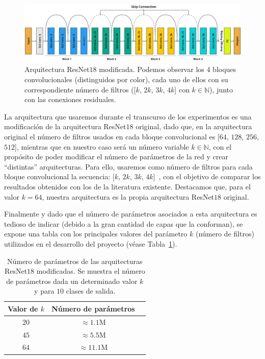 \begin{figure}[h]
    \centering
    \includegraphics[width=\linewidth]{img/experiments/resnet18modified.png}
    \caption[Arquitectura ResNet$18$ modificada.]{Arquitectura ResNet$18$ modificada. Podemos observar los 4 bloques convolucionales (distinguidos por color), cada uno de ellos con su correspondiente número de filtros ([$k$, $2k$, $3k$, $4k$] con $k \in \mathbb{N}$), junto con las conexiones residuales.}\label{fig:resnet18}
\end{figure}

La arquitectura que usaremos durante el transcurso de los experimentos es una modificación de la arquitectura ResNet$18$ original, dado que, en la arquitectura original el número de filtros usados en cada bloque convolucional es [$64$, $128$, $256$, $512$], mientras que en nuestro caso será un número variable $k \in \mathbb{N}$, con el propósito de poder modificar el número de parámetros de la red y crear ``distintas'' arquitecturas. Para ello, usaremos como número de filtros para cada bloque convolucional la secuencia: [$k$, $2k$, $3k$, $4k$]~\cite{Nakkiran2019}, con el objetivo de comparar los resultados obtenidos con los de la literatura existente. Destacamos que, para el valor $k=64$, nuestra arquitectura es la propia arquitectura ResNet$18$ original.\newline

Finalmente y dado que el número de parámetros asociados a esta arquitectura es tedioso de indicar (debido a la gran cantidad de capas que la conforman), se expone una tabla con los principales valores del parámetro $k$ (número de filtros) utilizados en el desarrollo del proyecto (véase Tabla~\ref{tab:numero-parametrosresnet}).\newline

\begin{table}[ht]
    \centering
    \begin{tabular}{|c|c|c|}
    \hline
    \textbf{Valor de $k$}           & \textbf{Número de parámetros}                     
    \\ \hline
    $20$                  & $\approx 1.1$\space M                                            \\ \hline
    $45$                  & $\approx 5.5$\space M                                             \\ \hline
    $64$                  & $\approx 11.1$\space M                                             \\ \hline
    \end{tabular}
    \caption[Número de parámetros de las arquitecturas ResNet$18$ modificadas.]{Número de parámetros de las arquitecturas ResNet$18$ modificadas. Se muestra el número de parámetros dada un determinado valor $k$ y para $10$ clases de salida.}\label{tab:numero-parametrosresnet}
\end{table}

